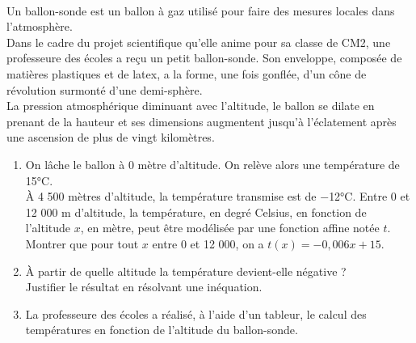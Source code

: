 \begin{activite}
   \ \\ [-16mm]
   \begin{QCM}
      Un ballon-sonde est un ballon à gaz utilisé pour faire des mesures locales dans l'atmosphère. \\
   Dans le cadre du projet scientifique qu’elle anime pour sa classe de CM2, une professeure des écoles a reçu un petit ballon-sonde. Son enveloppe, composée de matières plastiques et de latex, a la forme, une fois gonflée, d'un cône de révolution surmonté d'une demi-sphère. \\ 
   La pression atmosphérique diminuant avec l'altitude, le ballon se dilate en prenant de la hauteur et ses dimensions augmentent jusqu’à l’éclatement après une ascension de plus de vingt kilomètres.
   \begin{enumerate}
      \item On lâche le ballon à 0 mètre d’altitude. On relève alors une température de 15°C. \\
         À 4 500 mètres d'altitude, la température transmise est de $-$12°C. Entre 0 et 12 000 m d’altitude, la température, en degré Celsius, en fonction de l’altitude $x$, en mètre, peut être modélisée par une fonction affine notée $t$. \\
         Montrer que pour tout $x$ entre 0 et 12 000, on a $t(x) = -0,006x + 15$.            
      \item À partir de quelle altitude la température devient-elle négative ? \\
         Justifier le résultat en résolvant une inéquation.    
      \item La professeure des écoles a réalisé, à l’aide d’un tableur, le calcul des températures en fonction de l’altitude du ballon-sonde. \medskip
      \begin{center}
         {}
\end{center}
\end{enumerate}
\end{QCM}
\end{activite}
